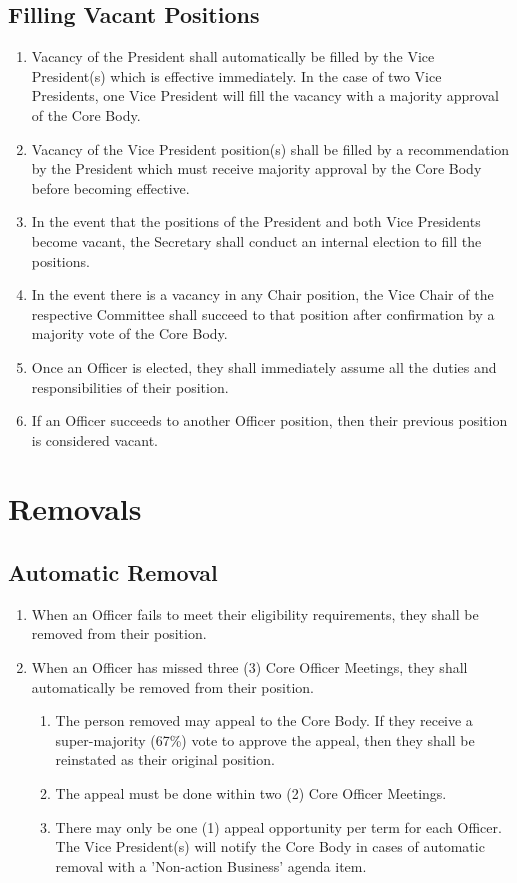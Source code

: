 \documentclass{article}
\newenvironment{li}{
\begin{enumerate}
  \setlength{\itemsep}{1pt}
  \setlength{\parskip}{0pt}
  \setlength{\parsep}{0pt}
}{\end{enumerate}}
\begin{document}
\subsection{Filling Vacant Positions}
\begin{li}
\item Vacancy of the President shall automatically be filled by the Vice President(s) which is effective immediately. In the case of two Vice Presidents, one Vice President will fill the vacancy with a majority approval of the Core Body.
\item Vacancy of the Vice President position(s) shall be filled by a recommendation by the President which must receive majority approval by the Core Body before becoming effective.
\item In the event that the positions of the President and both Vice Presidents become vacant, the Secretary shall conduct an internal election to fill the positions.
\item In the event there is a vacancy in any Chair position, the Vice Chair of the respective Committee shall succeed to that position after confirmation by a majority vote of the Core Body.
\item Once an Officer is elected, they shall immediately assume all the duties and responsibilities of their position.
\item If an Officer succeeds to another Officer position, then their previous position is considered vacant.
\end{li}


\section{Removals}
\subsection{Automatic Removal}
\begin{li}
\item When an Officer fails to meet their eligibility requirements, they shall be removed from their position.
\item When an Officer has missed three (3) Core Officer Meetings, they shall automatically be removed from their position.
	\begin{li}
	\item The person removed may appeal to the Core Body. If they receive a super-majority (67\%) vote to approve the appeal, then they shall be reinstated as their original position.
	\item The appeal must be done within two (2) Core Officer Meetings.
	\item There may only be one (1) appeal opportunity per term for each Officer. The Vice President(s) will notify the Core Body in cases of automatic removal with a 'Non-action Business' agenda item.
	\end{li}
\end{li}
\end{document}
